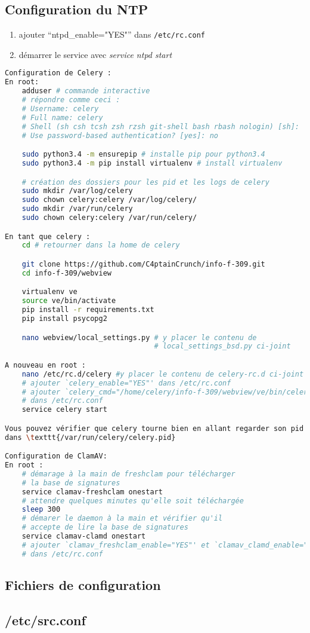 \documentclass[10pt,a4paper]{article}
\begin{document}
\subsection{Configuration du NTP}
\begin{enumerate}
  \item ajouter ``ntpd\_enable="YES"'' dans \texttt{/etc/rc.conf}
  \item démarrer le service avec \emph{service ntpd start}
\end{enumerate}

\begin{lstlisting}[language=bash]
Configuration de Celery :
En root:
    adduser # commande interactive
    # répondre comme ceci :
    # Username: celery
    # Full name: celery
    # Shell (sh csh tcsh zsh rzsh git-shell bash rbash nologin) [sh]:  bash
    # Use password-based authentication? [yes]: no

    sudo python3.4 -m ensurepip # installe pip pour python3.4
    sudo python3.4 -m pip install virtualenv # install virtualenv

    # création des dossiers pour les pid et les logs de celery
    sudo mkdir /var/log/celery
    sudo chown celery:celery /var/log/celery/
    sudo mkdir /var/run/celery
    sudo chown celery:celery /var/run/celery/

En tant que celery :
    cd # retourner dans la home de celery

    git clone https://github.com/C4ptainCrunch/info-f-309.git
    cd info-f-309/webview

    virtualenv ve
    source ve/bin/activate
    pip install -r requirements.txt
    pip install psycopg2

    nano webview/local_settings.py # y placer le contenu de
                                   # local_settings_bsd.py ci-joint

A nouveau en root :
    nano /etc/rc.d/celery #y placer le contenu de celery-rc.d ci-joint
    # ajouter `celery_enable="YES"' dans /etc/rc.conf
    # ajouter `celery_cmd="/home/celery/info-f-309/webview/ve/bin/celery"'
    # dans /etc/rc.conf
    service celery start

Vous pouvez vérifier que celery tourne bien en allant regarder son pid
dans \texttt{/var/run/celery/celery.pid}

Configuration de ClamAV:
En root :
    # démarage à la main de freshclam pour télécharger
    # la base de signatures
    service clamav-freshclam onestart
    # attendre quelques minutes qu'elle soit téléchargée
    sleep 300
    # démarer le daemon à la main et vérifier qu'il
    # accepte de lire la base de signatures
    service clamav-clamd onestart
    # ajouter `clamav_freshclam_enable="YES"' et `clamav_clamd_enable="YES"'
    # dans /etc/rc.conf

\end{lstlisting}

\newpage
\begin{appendices}
  \section{Fichiers de configuration}
  \subsection{/etc/src.conf}
  \label{sub:etc-src-conf}
  
\end{appendices}
\end{document}
